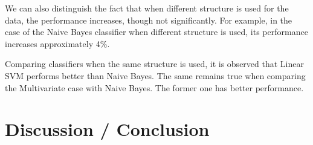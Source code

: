 \documentclass[preprint,journal,11pt]{vgtc}
\begin{document}
We can also distinguish the fact that when different structure is used for the data, the performance increases, though not significantly. For example, in the case of the Naive Bayes classifier when different structure is used, its performance increases approximately 4\%.

Comparing classifiers when the same structure is used, it is observed that Linear SVM performs better than Naive Bayes. The same remains true when comparing the Multivariate case with Naive Bayes. The former one has better performance.



\section{Discussion / Conclusion}
\label{sec:discussion}


\nocite{*}

\end{document}
